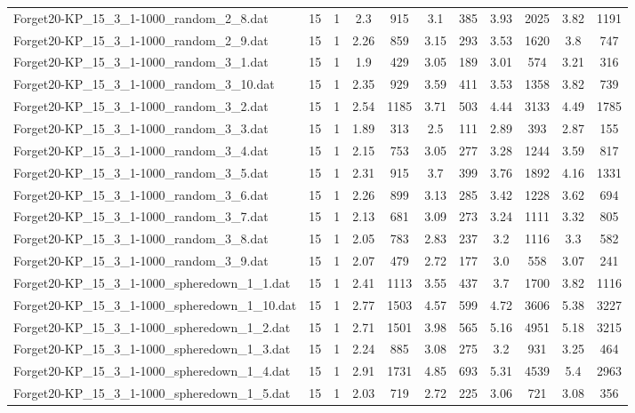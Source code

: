 \begin{table}[!ht]
\begin{tabular}{lcccccccccc}
Forget20-KP\_15\_3\_1-1000\_random\_2\_8.dat & 15 & 1 & 2.3 & 915 & 3.1 & 385 & 3.93 & 2025 & 3.82 & 1191 \\
Forget20-KP\_15\_3\_1-1000\_random\_2\_9.dat & 15 & 1 & 2.26 & 859 & 3.15 & 293 & 3.53 & 1620 & 3.8 & 747 \\
Forget20-KP\_15\_3\_1-1000\_random\_3\_1.dat & 15 & 1 & 1.9 & 429 & 3.05 & 189 & 3.01 & 574 & 3.21 & 316 \\
Forget20-KP\_15\_3\_1-1000\_random\_3\_10.dat & 15 & 1 & 2.35 & 929 & 3.59 & 411 & 3.53 & 1358 & 3.82 & 739 \\
Forget20-KP\_15\_3\_1-1000\_random\_3\_2.dat & 15 & 1 & 2.54 & 1185 & 3.71 & 503 & 4.44 & 3133 & 4.49 & 1785 \\
Forget20-KP\_15\_3\_1-1000\_random\_3\_3.dat & 15 & 1 & 1.89 & 313 & 2.5 & 111 & 2.89 & 393 & 2.87 & 155 \\
Forget20-KP\_15\_3\_1-1000\_random\_3\_4.dat & 15 & 1 & 2.15 & 753 & 3.05 & 277 & 3.28 & 1244 & 3.59 & 817 \\
Forget20-KP\_15\_3\_1-1000\_random\_3\_5.dat & 15 & 1 & 2.31 & 915 & 3.7 & 399 & 3.76 & 1892 & 4.16 & 1331 \\
Forget20-KP\_15\_3\_1-1000\_random\_3\_6.dat & 15 & 1 & 2.26 & 899 & 3.13 & 285 & 3.42 & 1228 & 3.62 & 694 \\
Forget20-KP\_15\_3\_1-1000\_random\_3\_7.dat & 15 & 1 & 2.13 & 681 & 3.09 & 273 & 3.24 & 1111 & 3.32 & 805 \\
Forget20-KP\_15\_3\_1-1000\_random\_3\_8.dat & 15 & 1 & 2.05 & 783 & 2.83 & 237 & 3.2 & 1116 & 3.3 & 582 \\
Forget20-KP\_15\_3\_1-1000\_random\_3\_9.dat & 15 & 1 & 2.07 & 479 & 2.72 & 177 & 3.0 & 558 & 3.07 & 241 \\
Forget20-KP\_15\_3\_1-1000\_spheredown\_1\_1.dat & 15 & 1 & 2.41 & 1113 & 3.55 & 437 & 3.7 & 1700 & 3.82 & 1116 \\
Forget20-KP\_15\_3\_1-1000\_spheredown\_1\_10.dat & 15 & 1 & 2.77 & 1503 & 4.57 & 599 & 4.72 & 3606 & 5.38 & 3227 \\
Forget20-KP\_15\_3\_1-1000\_spheredown\_1\_2.dat & 15 & 1 & 2.71 & 1501 & 3.98 & 565 & 5.16 & 4951 & 5.18 & 3215 \\
Forget20-KP\_15\_3\_1-1000\_spheredown\_1\_3.dat & 15 & 1 & 2.24 & 885 & 3.08 & 275 & 3.2 & 931 & 3.25 & 464 \\
Forget20-KP\_15\_3\_1-1000\_spheredown\_1\_4.dat & 15 & 1 & 2.91 & 1731 & 4.85 & 693 & 5.31 & 4539 & 5.4 & 2963 \\
Forget20-KP\_15\_3\_1-1000\_spheredown\_1\_5.dat & 15 & 1 & 2.03 & 719 & 2.72 & 225 & 3.06 & 721 & 3.08 & 356 \\

\end{tabular}
\end{table}
